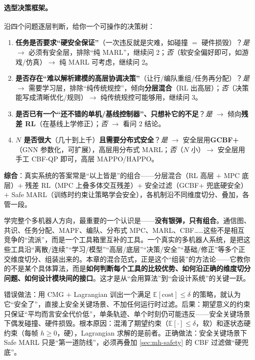 \paragraph{选型决策框架。}
沿四个问题逐层判断，给你一个可操作的决策树：
\begin{enumerate}
  \item \textbf{任务是否要求“硬安全保证”}（一次违反就是灾难，如碰撞 $=$ 硬件损毁）？\emph{是} $\to$ 必须有安全层，排除“纯 MARL”，继续问 2；\emph{否}（软安全偏好即可，如游戏/仿真）$\to$ 纯 MARL 可考虑，继续问 2。
  \item \textbf{是否存在“难以解析建模的高层协调决策”}（让行/编队重组/任务再分配）？\emph{是} $\to$ 需要学习层，排除“纯传统规控”，倾向\textbf{分层混合}（RL 出高层）；\emph{否}（决策能写成清晰优化/规则）$\to$ 纯传统规控可能够用，继续问 3。
  \item \textbf{是否已有一个“还不错的单机/基线控制器”、只想补它的不足}？\emph{是} $\to$ 倾向\textbf{残差 RL}（在基线上学修正）；\emph{否} $\to$ 看问 2 结论。
  \item \textbf{$N$ 是否很大}（几十到上千）\textbf{且需要分布式安全}？\emph{是} $\to$ 安全层用\textbf{GCBF+}（GNN 参数化，可扩展），高层用分布式 MARL；\emph{否}（$N$ 小）$\to$ 安全层用手工 CBF-QP 即可，高层 MAPPO/HAPPO。
\end{enumerate}
\textbf{综合}：真实系统的答案常是“以上皆是”的组合——分层混合（RL 高层 $+$ MPC 底层）$+$ 残差 RL（MPC 上叠多体交互残差）$+$ 安全过滤（GCBF+ 兜底硬安全）$+$ Safe MARL（训练时约束让策略学会安全），各机制沿不同维度切分、叠加，各管一段。

\begin{insight}
学完整个多机器人方向，最重要的一个认识是——\textbf{没有银弹，只有组合}。通信图、共识、任务分配、MAPF、编队、分布式 MPC、MARL、CBF……这些不是相互竞争的“流派”，而是一个工具箱里互补的工具。一个真实的多机器人系统，是把这些工具沿“离散/连续”“学习/模型”“高层/底层”“决策/安全”“基础/修正”等多个正交维度切分、组装出来的。本章的混合范式，正是这个“组装”的方法论——它教你的不是某个具体算法，而是\textbf{如何判断每个工具的比较优势、如何沿正确的维度切分问题、如何设计模块间的接口}。这才是从“会用算法”到“会设计系统”的关键一跃。
\end{insight}

\begin{pitfall}
错误做法：用 CMG $+$ Lagrangian 训出一个满足 $\mathbb{E}[\text{cost}]\le\delta$ 的策略，就认为它“安全了”，直接上安全关键场景、不加任何运行时过滤。后果：期望意义的约束只保证“平均而言安全代价低”，单条轨迹、单个时刻仍可能违反——安全关键场景下偶发碰撞、硬件损毁。根本原因：混淆了期望约束（$\mathbb{E}[\cdot]\le\delta$，软）和逐状态硬约束（每帧 $h\ge0$，硬），Lagrangian 求解的是前者。正确做法：安全关键场景下 Safe MARL 只是“第一道防线”，必须再叠加 \cref{sec:mh-safety} 的 CBF 过滤做“硬兜底”。
\end{pitfall}

